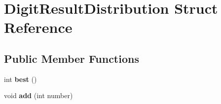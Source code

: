 \hypertarget{struct_digit_result_distribution}{}\section{Digit\+Result\+Distribution Struct Reference}
\label{struct_digit_result_distribution}
\subsection*{Public Member Functions}
\begin{DoxyCompactItemize}
\item 
\mbox{\label{struct_digit_result_distribution_a51eaca67148d243afb838b8d93aa6362}} 
int {\bfseries best} ()
\item 
\mbox{\label{struct_digit_result_distribution_a00f633f47446eae9ce2815bfb4d8bc19}} 
void {\bfseries add} (int number)
\end{DoxyCompactItemize}
